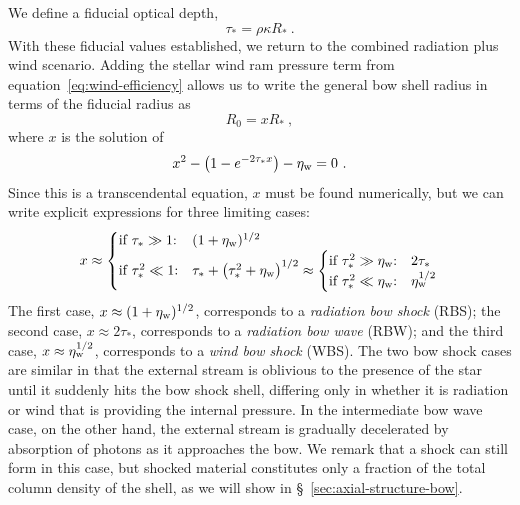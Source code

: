 We define a fiducial optical depth,
\begin{equation}
  \label{eq:tau-star}
  \tau_* = \rho \kappa R_* \ .
\end{equation}
With these fiducial values established, we return to the combined
radiation plus wind scenario.  Adding the stellar wind ram pressure
term from equation~\eqref{eq:wind-efficiency} allows us to write the
general bow shell radius in terms of the fiducial radius as
\begin{equation}
  \label{eq:R0-definition}
  R_0 = x R_* \ ,
\end{equation}
where \(x\) is the solution of
\begin{equation}
  \label{eq:rad-full-x}
  x^2 - \bigl(1 - e^{-2 \tau_* x} \bigr) - \eta_{\text{w}} = 0 \ .
\end{equation}
Since this is a transcendental equation, \(x\) must be found
numerically, but we can write explicit expressions for three limiting
cases:
\begin{equation}
  \label{eq:x-cases}
  x \approx
  \begin{cases}
    \text{if \(\tau_* \gg 1\):} & (1 + \eta_{\text{w}})^{1/2}  \\
    \text{if \(\tau_*^2 \ll 1\):} & \tau_* + \bigl( \tau_*^2 + \eta_{\text{w}} \bigr)^{1/2} \approx
    \begin{cases}
      \text{if \(\tau_*^2 \gg \eta\ensuremath{_{\text{w}}}\):} & 2 \tau_*  \\
      \text{if \(\tau_*^2 \ll \eta\ensuremath{_{\text{w}}}\):} & \eta_{\text{w}}^{1/2} 
    \end{cases}
  \end{cases}
\end{equation}
The first case, \(x \approx (1 + \eta_{\text{w}})^{1/2}\), corresponds to a
\textit{radiation bow shock} (RBS); the second case,
\(x \approx 2 \tau_* \), corresponds to a \textit{radiation bow wave} (RBW);
and the third case, \(x \approx \eta_{\text{w}}^{1/2}\), corresponds to a
\textit{wind bow shock} (WBS).  The two bow shock cases are similar in
that the external stream is oblivious to the presence of the star
until it suddenly hits the bow shock shell, differing only in whether
it is radiation or wind that is providing the internal pressure.  In
the intermediate bow wave case, on the other hand, the external stream
is gradually decelerated by absorption of photons as it approaches the
bow.  We remark that a shock can still form in this case, but shocked
material constitutes only a fraction of the total column density of
the shell, as we will show in \S~\ref{sec:axial-structure-bow}.

